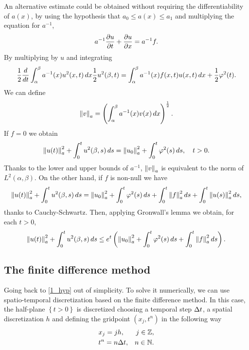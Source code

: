 An alternative estimate could be obtained without requiring the differentiability of \(a(x)\), by using the hypothesis that \(a_0 \leq a(x) \leq a_1\) and multiplying the equation for \(a^{-1}\),
\[
    a^{-1} \partialderivative{u}{t} + \partialderivative{u}{x} = a^{-1}f.
\]
By multiplying by \(u\) and integrating
\[
    \frac{1}{2} \frac{d}{dt} \int_\alpha^\beta a^{-1}(x)u^2(x,t) \, dx \frac{1}{2} u^2(\beta,t) = \int_\alpha^\beta a^{-1}(x)f(x,t)u(x,t) \, dx + \frac{1}{2} \varphi^2(t).
\]
We can define 
\[
    \norm{v}_a = \left( \int_\alpha^\beta a^{-1}(x) v(x) \, dx \right)^{\frac{1}{2}}.
\]
If \(f=0\) we obtain 
\[
    \norm{u(t)}^2_a + \int_0^t u^2(\beta, s)\, ds = \norm{u_0}^2_a + \int_0^t \varphi^2(s) \, ds, \quad t > 0.
\]
Thanks to the lower and upper bounds of \(a^{-1}\), \(\norm{v}_a\) is equivalent to the norm of \({L^2(\alpha,\beta)}\). On the other hand, if \(f\) is non-null we have 
\[
    \norm{u(t)}^2_a + \int_0^t u^2(\beta, s)\, ds = \norm{u_0}^2_a + \int_0^t \varphi^2(s) \, ds + \int_0^t \norm{f}^2_a \, ds + \int_0^t \norm{u(s)}^2_a \, ds,
\]
thanks to Cauchy-Schwartz. Then, applying Gronwall's lemma we obtain, for each \(t>0\), 
\[
    \norm{u(t)}^2_a + \int_0^t u^2(\beta, s) \, ds \leq e^t \left( \norm{u_0}^2_a + \int_0^t \varphi^2(s) \, ds + \int_0^t \norm{f}^2_a \, ds\right).
\]
\subsection{The finite difference method}
Going back to \eqref{1_hyp} out of simplicity. To solve it numerically, we can use spatio-temporal discretization based on the finite difference method. In this case, the half-plane \(\left\{ t>0 \right\}\) is discretized choosing a temporal step \(\Delta t\), a spatial discretization \(h\) and defining the gridpoint \((x_j, t^n)\) in the following way 
\begin{align*}
    &x_j = jh,  &j \in \mathbb{Z},    &\\
    &t^n = n\Delta t, & n\in \mathbb{N}.&
\end{align*}


